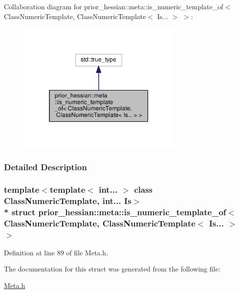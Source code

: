 Collaboration diagram for prior\+\_\+hessian\+:\+:meta\+:\+:is\+\_\+numeric\+\_\+template\+\_\+of$<$ Class\+Numeric\+Template, Class\+Numeric\+Template$<$ Is... $>$ $>$\+:\nopagebreak
\begin{figure}[H]
\begin{center}
\leavevmode
\includegraphics[width=231pt]{structprior__hessian_1_1meta_1_1is__numeric__template__of_3_01ClassNumericTemplate_00_01ClassNumfc63cd2b8a016af527761c53c6f7f2ac}
\end{center}
\end{figure}


\subsubsection{Detailed Description}
\subsubsection*{template$<$template$<$ int... $>$ class Class\+Numeric\+Template, int... Is$>$\\*
struct prior\+\_\+hessian\+::meta\+::is\+\_\+numeric\+\_\+template\+\_\+of$<$ Class\+Numeric\+Template, Class\+Numeric\+Template$<$ Is... $>$ $>$}



Definition at line 89 of file Meta.\+h.



The documentation for this struct was generated from the following file\+:\begin{DoxyCompactItemize}
\item 
\hyperlink{Meta_8h}{Meta.\+h}\end{DoxyCompactItemize}
